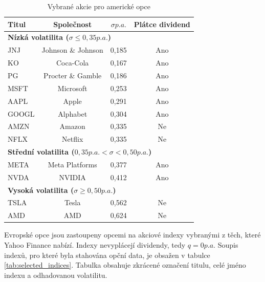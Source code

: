 \documentclass[male,czech,api_bc]{kitheses}
\begin{document}
 \begin{table}[h]
   \centering
   \caption{Vybrané akcie pro americké opce}
   \label{tab:selected_stocks}
   \begin{tabular}{lccc}
     \toprule
     \textbf{Titul} & \textbf{Společnost} & \(\sigma p.a.\) & Plátce dividend \\
     \midrule
     \multicolumn{4}{l}{\textbf{Nízká volatilita (\(\sigma \le 0{,}35 p.a.\))}} \\
     JNJ  & Johnson \& Johnson & 0{,}185 & Ano \\
     KO   & Coca-Cola          & 0{,}167 & Ano \\
     PG   & Procter \& Gamble  & 0{,}186 & Ano \\
     MSFT & Microsoft          & 0{,}253 & Ano \\
     AAPL & Apple              & 0{,}291 & Ano \\
     GOOGL & Alphabet          & 0{,}304 & Ano \\
     AMZN & Amazon             & 0{,}335 & Ne \\
     NFLX & Netflix            & 0{,}335 & Ne \\
     \midrule
     \multicolumn{4}{l}{\textbf{Střední volatilita (\(0{,}35 p.a. < \sigma < 0{,}50 p.a. \))}} \\
     META & Meta Platforms     & 0{,}377 & Ano \\
     NVDA & NVIDIA             & 0{,}412 & Ano \\
     \midrule
     \multicolumn{4}{l}{\textbf{Vysoká volatilita (\(\sigma \ge 0{,}50 p.a. \))}} \\
     TSLA & Tesla              & 0{,}562 & Ne \\
     AMD  & AMD                & 0{,}624 & Ne \\
     \bottomrule
   \end{tabular}
 \end{table}

 Evropské opce jsou zastoupeny opcemi na akciové indexy vybranými z těch, které Yahoo Finance nabízí. Indexy nevyplácejí dividendy, tedy \(q = 0 p.a. \) Soupis indexů, pro které byla stahována opční data, je obsažen v tabulce \ref{tab:selected_indices}. Tabulka obsahuje zkrácené označení titulu, celé jméno indexu a odhadovanou volatilitu.
\end{document}
